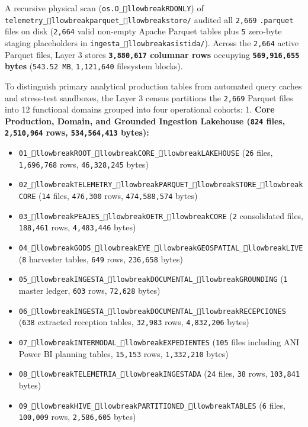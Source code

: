 \documentclass[10pt,a4paper]{article}
\begin{document}
A recursive physical scan (\texttt{os.O\_llowbreak{}RDONLY}) of \texttt{telemetry\_llowbreak{}parquet\_llowbreak{}store/} audited all \texttt{2,669} \texttt{.parquet} files on disk (\texttt{2,664} valid non-empty Apache Parquet tables plus \texttt{5} zero-byte staging placeholders in \texttt{ingesta\_llowbreak{}asistida/}). Across the \texttt{2,664} active Parquet files, Layer 3 stores \textbf{\texttt{3,880,617} columnar rows} occupying \textbf{\texttt{569,916,655} bytes} (\texttt{543.52 MB}, \texttt{1,121,640} filesystem blocks).

To distinguish primary analytical production tables from automated query caches and stress-test sandboxes, the Layer 3 census partitions the \texttt{2,669} Parquet files into 12 functional domains grouped into four operational cohorts:
1. \textbf{Core Production, Domain, and Grounded Ingestion Lakehouse (\texttt{824} files, \texttt{2,510,964} rows, \texttt{534,564,413} bytes):}\par
\begin{itemize}
  \item \texttt{01\_llowbreak{}ROOT\_llowbreak{}CORE\_llowbreak{}LAKEHOUSE} (\texttt{26} files, \texttt{1,696,768} rows, \texttt{46,328,245} bytes)
  \item \texttt{02\_llowbreak{}TELEMETRY\_llowbreak{}PARQUET\_llowbreak{}STORE\_llowbreak{}CORE} (\texttt{14} files, \texttt{476,300} rows, \texttt{474,588,574} bytes)
  \item \texttt{03\_llowbreak{}PEAJES\_llowbreak{}OETR\_llowbreak{}CORE} (\texttt{2} consolidated files, \texttt{188,461} rows, \texttt{4,483,446} bytes)
  \item \texttt{04\_llowbreak{}GODS\_llowbreak{}EYE\_llowbreak{}GEOSPATIAL\_llowbreak{}LIVE} (\texttt{8} harvester tables, \texttt{649} rows, \texttt{236,658} bytes)
  \item \texttt{05\_llowbreak{}INGESTA\_llowbreak{}DOCUMENTAL\_llowbreak{}GROUNDING} (\texttt{1} master ledger, \texttt{603} rows, \texttt{72,628} bytes)
  \item \texttt{06\_llowbreak{}INGESTA\_llowbreak{}DOCUMENTAL\_llowbreak{}RECEPCIONES} (\texttt{638} extracted reception tables, \texttt{32,983} rows, \texttt{4,832,206} bytes)
  \item \texttt{07\_llowbreak{}INTERMODAL\_llowbreak{}EXPEDIENTES} (\texttt{105} files including ANI Power BI planning tables, \texttt{15,153} rows, \texttt{1,332,210} bytes)
  \item \texttt{08\_llowbreak{}TELEMETRIA\_llowbreak{}INGESTADA} (\texttt{24} files, \texttt{38} rows, \texttt{103,841} bytes)
  \item \texttt{09\_llowbreak{}HIVE\_llowbreak{}PARTITIONED\_llowbreak{}TABLES} (\texttt{6} files, \texttt{100,009} rows, \texttt{2,586,605} bytes)
\end{itemize}
\end{document}
